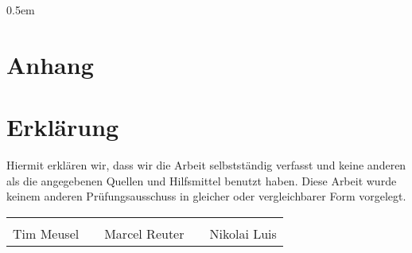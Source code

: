 
\printglossaries%

\begingroup
{}
\emergencystretch0.5em
\printbibliography[heading=bibnumbered]
\endgroup

\chapter{Anhang}


\FloatBarrier%

\FloatBarrier%


\chapter{Erklärung}
Hiermit erklären wir, dass wir die Arbeit selbstständig verfasst und keine
anderen als die angegebenen Quellen und Hilfsmittel benutzt haben. Diese Arbeit
wurde keinem anderen Prüfungsausschuss in gleicher oder vergleichbarer Form
vorgelegt.

\vspace{10ex}
{\centering
\renewcommand{\arraystretch}{0.9}
\begin{tabular}{p{}p{}p{}p{}p{}}
  \dotfill                    & & \dotfill                      & & \dotfill \\
  \centering\footnotesize{Tim Meusel}& & \centering\footnotesize{Marcel Reuter}& & \centering\footnotesize{Nikolai Luis}%
\end{tabular}
}

